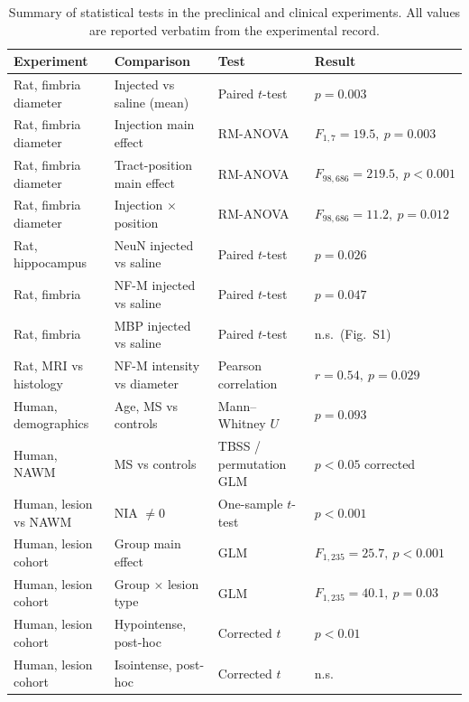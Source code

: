 \documentclass[11pt]{article}
\begin{document}
\begin{table}[htbp]
\centering
\caption{Summary of statistical tests in the preclinical and clinical experiments. All values are reported verbatim from the experimental record.}
\label{tab:stats}
\begin{tabular}{llll}
\toprule
Experiment & Comparison & Test & Result \\
\midrule
Rat, fimbria diameter & Injected vs saline (mean) & Paired $t$-test & $p=0.003$ \\
Rat, fimbria diameter & Injection main effect     & RM-ANOVA & $F_{1,7}=19.5,\ p=0.003$ \\
Rat, fimbria diameter & Tract-position main effect & RM-ANOVA & $F_{98,686}=219.5,\ p<0.001$ \\
Rat, fimbria diameter & Injection $\times$ position & RM-ANOVA & $F_{98,686}=11.2,\ p=0.012$ \\
Rat, hippocampus      & NeuN injected vs saline    & Paired $t$-test & $p=0.026$ \\
Rat, fimbria          & NF-M injected vs saline    & Paired $t$-test & $p=0.047$ \\
Rat, fimbria          & MBP injected vs saline     & Paired $t$-test & n.s.\ (Fig.~S1) \\
Rat, MRI vs histology & NF-M intensity vs diameter & Pearson correlation & $r=0.54,\ p=0.029$ \\
Human, demographics   & Age, MS vs controls        & Mann--Whitney $U$ & $p=0.093$ \\
Human, NAWM           & MS vs controls             & TBSS / permutation GLM & $p<0.05$ corrected \\
Human, lesion vs NAWM & NIA $\neq 0$               & One-sample $t$-test & $p<0.001$ \\
Human, lesion cohort  & Group main effect          & GLM & $F_{1,235}=25.7,\ p<0.001$ \\
Human, lesion cohort  & Group $\times$ lesion type & GLM & $F_{1,235}=40.1,\ p=0.03$ \\
Human, lesion cohort  & Hypointense, post-hoc      & Corrected $t$ & $p<0.01$ \\
Human, lesion cohort  & Isointense, post-hoc       & Corrected $t$ & n.s.\ \\
\bottomrule
\end{tabular}
\end{table}
\end{document}
